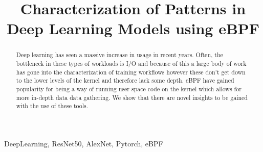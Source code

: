 \documentclass[conference]{IEEEtran}
\begin{document}
\title{Characterization of Patterns in Deep Learning Models using eBPF\\
}

\author{
	\and
	\and
}

\maketitle

\begin{abstract}
    Deep learning has seen a massive increase in usage in recent years. Often, the bottleneck in these types of workloads is I/O and because of this a large body of work has gone into 
    the characterization of training workflows however these don't get down to the lower levels of the kernel and therefore lack some depth. eBPF have gained popularity for being a way
    of running user space code on the kernel which allows for more in-depth data data gathering. We show that there are novel insights to be gained with the use of these tools.


\end{abstract}

\begin{IEEEkeywords}
     DeepLearning, ResNet50, AlexNet, Pytorch, eBPF
\end{IEEEkeywords}
\end{document}
